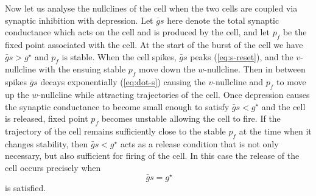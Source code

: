 
Now let us analyse the nullclines of the \quiet{} cell when the two cells are coupled via synaptic inhibition with depression.
Let \(\bar g s\) here denote the total synaptic conductance which acts on the \quiet{} cell and is produced by the \free{} cell, and let \(p_{f}\) be the fixed point associated with the \quiet{} cell.
At the start of the burst of the \free{} cell we have \(\bar g s > g^{\star}\) and \(p_{f}\) is stable.
When the \free{} cell spikes, \(\bar g s\) peaks (\cref{eq:s-reset}), and the \(v\)-nullcline with the ensuing stable \(p_f\) move down the \(w\)-nullcline.
Then in between spikes \(\bar g s\) decays exponentially (\cref{eq:dot-s}) causing the \(v\)-nullcline and \(p_{f}\) to move up the \(w\)-nullcline while attracting trajectories of the \quiet{} cell.
Once depression causes the synaptic conductance to become small enough to satisfy \(\bar g s<g^{\star}\) and the \quiet{} cell is released, fixed point \(p_{f}\) becomes unstable allowing the \quiet{} cell to fire.
If the trajectory of the \quiet{} cell remains sufficiently close to the stable \(p_{f}\) at the time when it changes stability, then \(\bar g s < g^{\star}\) acts as a release condition that is not only necessary, but also sufficient for firing of the \quiet{} cell.
In this case the release of the \quiet{} cell occurs precisely when
\begin{equation}
	~\label{eq:release}
	\bar g s=g^{\star}
\end{equation}
is satisfied.

